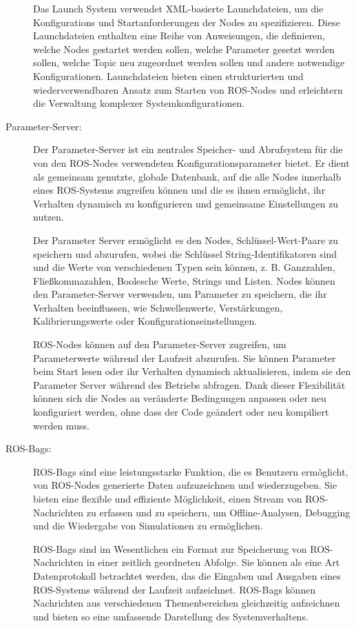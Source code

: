 \begin{description}
    Das Launch System verwendet XML-basierte Launchdateien, um die Konfigurations und Startanforderungen der Nodes zu spezifizieren. Diese Launchdateien enthalten eine Reihe von Anweisungen, die definieren, welche Nodes gestartet werden sollen, welche Parameter gesetzt werden sollen, welche Topic neu zugeordnet werden sollen und andere notwendige Konfigurationen. Launchdateien bieten einen strukturierten und wiederverwendbaren Ansatz zum Starten von ROS-Nodes und erleichtern die Verwaltung komplexer Systemkonfigurationen.
    
    \item[Parameter-Server:] Der Parameter-Server ist ein zentrales Speicher- und Abrufsystem für die von den ROS-Nodes verwendeten Konfigurationsparameter bietet. Er dient als gemeinsam genutzte, globale Datenbank, auf die alle Nodes innerhalb eines \ac{ROS}-Systems zugreifen können und die es ihnen ermöglicht, ihr Verhalten dynamisch zu konfigurieren und gemeinsame Einstellungen zu nutzen.

    Der Parameter Server ermöglicht es den Nodes, Schlüssel-Wert-Paare zu speichern und abzurufen, wobei die Schlüssel String-Identifikatoren sind und die Werte von verschiedenen Typen sein können, z. B. Ganzzahlen, Fließkommazahlen, Boolesche Werte, Strings und Listen. Nodes können den Parameter-Server verwenden, um Parameter zu speichern, die ihr Verhalten beeinflussen, wie Schwellenwerte, Verstärkungen, Kalibrierungswerte oder Konfigurationseinstellungen.
    
    ROS-Nodes können auf den Parameter-Server zugreifen, um Parameterwerte während der Laufzeit abzurufen. Sie können Parameter beim Start lesen oder ihr Verhalten dynamisch aktualisieren, indem sie den Parameter Server während des Betriebs abfragen. Dank dieser Flexibilität können sich die Nodes an veränderte Bedingungen anpassen oder neu konfiguriert werden, ohne dass der Code geändert oder neu kompiliert werden muss.
    
    
    \item[ROS-Bags:] ROS-Bags sind eine leistungsstarke Funktion, die es Benutzern ermöglicht, von ROS-Nodes generierte Daten aufzuzeichnen und wiederzugeben. Sie bieten eine flexible und effiziente Möglichkeit, einen Stream von \ac{ROS}-Nachrichten zu erfassen und zu speichern, um Offline-Analysen, Debugging und die Wiedergabe von Simulationen zu ermöglichen.

    ROS-Bags sind im Wesentlichen ein Format zur Speicherung von \ac{ROS}-Nachrichten in einer zeitlich geordneten Abfolge. Sie können als eine Art Datenprotokoll betrachtet werden, das die Eingaben und Ausgaben eines \ac{ROS}-Systems während der Laufzeit aufzeichnet. ROS-Bags können Nachrichten aus verschiedenen Themenbereichen gleichzeitig aufzeichnen und bieten so eine umfassende Darstellung des Systemverhaltens.
    

\end{description}
